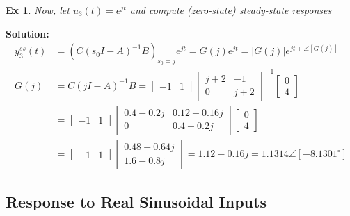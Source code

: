 \documentclass[twoside]{article}
\newtheorem{exmp}[theorem]{Ex}
\begin{document}
\begin{exmp}
Now, let $u_3(t) = e^{j t}$ and compute (zero-state) steady-state responses 
\end{exmp}

\textbf{Solution:}
\begin{align*} 
y_3^{ss}(t) &= \left( C \left(s_0 I - A \right)^{-1} B \right)_{s_0 = j} e^{j t} = G(j) e^{j t} = |G( j)| e^{j t + \angle [G(j)]}
\\[1ex]
G(j) &= C (j I -A)^{-1} B =  \begin{bmatrix} -1 & 1 \end{bmatrix}  \begin{bmatrix} j+2 & -1 \\ 0 & j+2 \end{bmatrix}^{-1}  \begin{bmatrix} 0 \\ 4 \end{bmatrix} 
\\[1ex]
&= \begin{bmatrix} -1 & 1 \end{bmatrix}  \begin{bmatrix} 0.4 - 0.2 j & 0.12 - 0.16 j \\ 0 & 0.4 - 0.2 j \end{bmatrix}  \begin{bmatrix} 0 \\ 4 \end{bmatrix} 
\\[1ex]
&= \begin{bmatrix} -1 & 1 \end{bmatrix} \begin{bmatrix} 0.48 - 0.64 j \\ 1.6 - 0.8 j \end{bmatrix} = 1.12 - 0.16 j = 1.1314 \angle[ -8.1301^\circ ]
\end{align*}

\subsection{Response to Real Sinusoidal Inputs}
\end{document}
